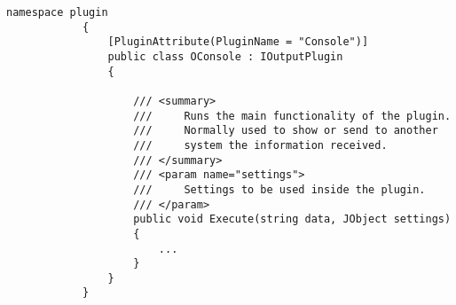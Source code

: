         \begin{lstlisting}[style=csharp, caption=Plugin de salida]
            namespace plugin
            {
                [PluginAttribute(PluginName = "Console")]
                public class OConsole : IOutputPlugin
                {
                
                    /// <summary>
                    ///     Runs the main functionality of the plugin.
                    ///     Normally used to show or send to another
                    ///     system the information received.
                    /// </summary>
                    /// <param name="settings">
                    ///     Settings to be used inside the plugin.
                    /// </param>
                    public void Execute(string data, JObject settings)
                    {
                        ...
                    }
                }
            }
        \end{lstlisting}
